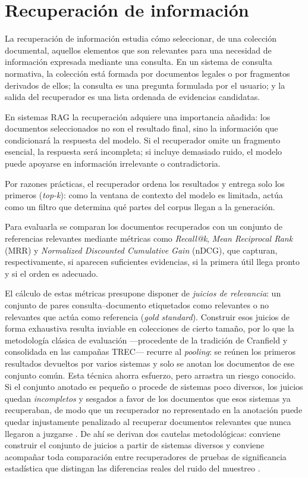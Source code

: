 \section{Recuperación de información}
\label{sec:recuperacion-informacion}

La recuperación de información estudia cómo seleccionar, de una colección documental, aquellos elementos que son relevantes para una necesidad de información expresada mediante una consulta. En un sistema de consulta normativa, la colección está formada por documentos legales o por fragmentos derivados de ellos; la consulta es una pregunta formulada por el usuario; y la salida del recuperador es una lista ordenada de evidencias candidatas.

En sistemas RAG la recuperación adquiere una importancia añadida: los documentos seleccionados no son el resultado final, sino la información que condicionará la respuesta del modelo. Si el recuperador omite un fragmento esencial, la respuesta será incompleta; si incluye demasiado ruido, el modelo puede apoyarse en información irrelevante o contradictoria.

Por razones prácticas, el recuperador ordena los resultados y entrega solo los primeros (\emph{top-k}): como la ventana de contexto del modelo es limitada, actúa como un filtro que determina qué partes del corpus llegan a la generación.

Para evaluarla se comparan los documentos recuperados con un conjunto de referencias relevantes mediante métricas como \emph{Recall@k}, \emph{Mean Reciprocal Rank} (MRR) y \emph{Normalized Discounted Cumulative Gain} (nDCG), que capturan, respectivamente, si aparecen suficientes evidencias, si la primera útil llega pronto y si el orden es adecuado.

El cálculo de estas métricas presupone disponer de \emph{juicios de relevancia}: un conjunto de pares consulta--documento etiquetados como relevantes o no relevantes que actúa como referencia (\emph{gold standard}). Construir esos juicios de forma exhaustiva resulta inviable en colecciones de cierto tamaño, por lo que la metodología clásica de evaluación —procedente de la tradición de Cranfield y consolidada en las campañas TREC— recurre al \emph{pooling}: se reúnen los primeros resultados devueltos por varios sistemas y solo se anotan los documentos de ese conjunto común. Esta técnica ahorra esfuerzo, pero arrastra un riesgo conocido. Si el conjunto anotado es pequeño o procede de sistemas poco diversos, los juicios quedan \emph{incompletos} y sesgados a favor de los documentos que esos sistemas ya recuperaban, de modo que un recuperador no representado en la anotación puede quedar injustamente penalizado al recuperar documentos relevantes que nunca llegaron a juzgarse \cite{buckley2004incomplete}. De ahí se derivan dos cautelas metodológicas: conviene construir el conjunto de juicios a partir de sistemas diversos y conviene acompañar toda comparación entre recuperadores de pruebas de significancia estadística que distingan las diferencias reales del ruido del muestreo \cite{smucker2007significance}.

